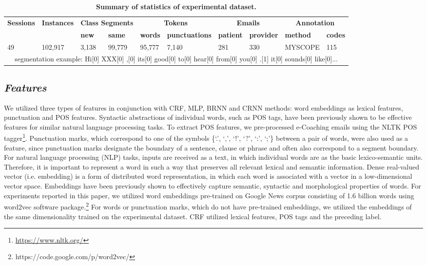 \documentclass{amia}
\begin{document}
\begin{table}[ht]
\centering
\caption{\textbf{Summary of statistics of experimental dataset.}}
\label{tab:datastat}
 \begin{tabular}{|l|l|l|l|l|l|l|l|l|l|}
  \hline
   \multirow{2}{*}{\textbf{Sessions}} & \multirow{2}{*}{\textbf{Instances}} & \multicolumn{2}{|c|}{\textbf{Class Segments}} & \multicolumn{2}{|c|}{\textbf{Tokens}} & \multicolumn{2}{|c|}{\textbf{Emails}} & \multicolumn{2}{|c|}{\textbf{Annotation}} \\\cline{3-10}
   &  & \textbf{new}  & \textbf{same} & \textbf{words} & \textbf{punctuations}  & \textbf{patient} & \textbf{provider} & \textbf{method}  & \textbf{codes} \\ \hline    
 49 & 102,917 & 3,138 & 99,779 & 95,777 & 7,140 & 281 & 330 & MYSCOPE & 115 \\ \hline
 \multicolumn{10}{|c|}{segmentation example: Hi[0] XXX[0] ,[0] its[0] good[0] to[0] hear[0] from[0] you[0] .[1] it[0] sounds[0] like[0]...} \\ \hline
  \end{tabular}
\end{table}     

\subsection*{\textit{Features}}
We utilized three types of features in conjunction with CRF, MLP, BRNN and CRNN methods: word embeddings as lexical features, punctuation and POS features. Syntactic abstractions of individual words, such as POS tags, have been previously shown to be effective features for similar natural language processing tasks.\cite{liu2005using,treviso2017sentence} To extract POS features, we pre-processed e-Coaching emails using the NLTK POS tagger\footnote{\url{https://www.nltk.org/}}. Punctuation marks, which correspond to one of the symbols \{`.', `,', `!', `?', `:', `;'\} between a pair of words, were also used as a feature, since punctuation marks designate the boundary of a sentence, clause or phrase and often also correspond to a segment boundary.\cite{cho2002text} For natural language processing (NLP) tasks, inputs are received as a text, in which individual words are as the basic lexico-semantic units. Therefore, it is important to represent a word in such a way that preserves all relevant lexical and semantic information. Dense real-valued vector (i.e. embedding) is a form of distributed word representation, in which each word is associated with a vector in a low-dimensional vector space. Embeddings have been previously shown to effectively capture semantic, syntactic and morphological properties of words.\cite{pennington2014glove, mikolov2013distributed} For experiments reported in this paper, we utilized word embeddings pre-trained on Google News corpus consisting of 1.6 billion words using word2vec software package.\footnote{\label{fn:word2vec}https://code.google.com/p/word2vec/} For words or punctuation marks, which do not have pre-trained embeddings, we utilized the embeddings of the same dimensionality trained on the experimental dataset. CRF utilized lexical features, POS tags and the preceding label. 
\end{document}
